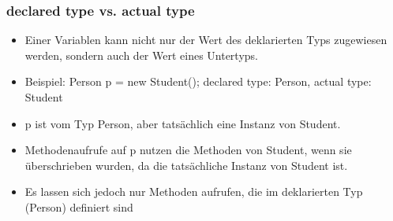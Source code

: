 \begin{frame}[fragile]
\frametitle{declared type vs. actual type}
\begin{itemize}
\item Einer Variablen kann nicht nur der Wert des deklarierten Typs zugewiesen werden, sondern auch der Wert eines Untertyps.
\item Beispiel: Person p = new Student(); declared type: Person, actual type: Student
\item p ist vom Typ Person, aber tatsächlich eine Instanz von Student.
\item Methodenaufrufe auf p nutzen die Methoden von Student, wenn sie überschrieben wurden, da die tatsächliche Instanz von Student ist.
\item Es lassen sich jedoch nur Methoden aufrufen, die im deklarierten Typ (Person) definiert sind 
\end{itemize}
\end{frame}